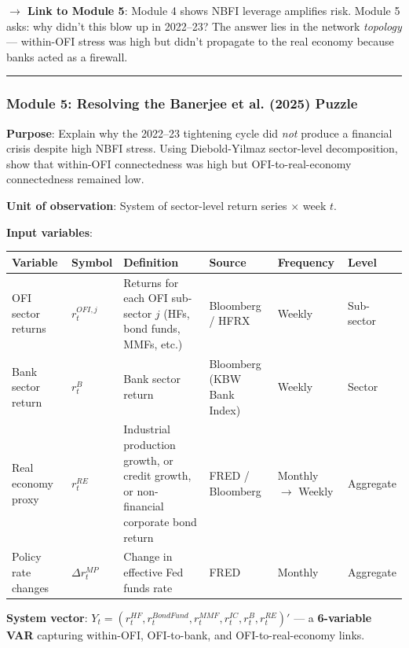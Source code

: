 \documentclass[11pt,a4paper]{article}
\begin{document}
\textbf{$\rightarrow$ Link to Module 5}: Module 4 shows NBFI leverage amplifies risk. Module 5 asks: why didn't this blow up in 2022--23? The answer lies in the network \textit{topology} --- within-OFI stress was high but didn't propagate to the real economy because banks acted as a firewall.


\bigskip\noindent\rule{\textwidth}{0.4pt}\bigskip


\subsubsection{Module 5: Resolving the Banerjee et al. (2025) Puzzle}

\textbf{Purpose}: Explain why the 2022--23 tightening cycle did \textit{not} produce a financial crisis despite high NBFI stress. Using Diebold-Yilmaz sector-level decomposition, show that within-OFI connectedness was high but OFI-to-real-economy connectedness remained low.

\textbf{Unit of observation}: System of sector-level return series $\times$ week $t$.

\textbf{Input variables}:


{\small
\begin{longtable}{|p{}|p{}|p{}|p{}|p{}|p{}|}
\hline
\textbf{Variable} & \textbf{Symbol} & \textbf{Definition} & \textbf{Source} & \textbf{Frequency} & \textbf{Level} \\
\hline
\endhead
OFI sector returns & $r_t^{OFI,j}$ & Returns for each OFI sub-sector $j$ (HFs, bond funds, MMFs, etc.) & Bloomberg / HFRX & Weekly & Sub-sector \\
\hline
Bank sector return & $r_t^{B}$ & Bank sector return & Bloomberg (KBW Bank Index) & Weekly & Sector \\
\hline
Real economy proxy & $r_t^{RE}$ & Industrial production growth, or credit growth, or non-financial corporate bond return & FRED / Bloomberg & Monthly $\rightarrow$ Weekly & Aggregate \\
\hline
Policy rate changes & $\Delta r_t^{MP}$ & Change in effective Fed funds rate & FRED & Monthly & Aggregate \\
\hline
\end{longtable}
}

\textbf{System vector}: $Y_t = (r_t^{HF}, r_t^{BondFund}, r_t^{MMF}, r_t^{IC}, r_t^{B}, r_t^{RE})'$ --- a \textbf{6-variable VAR} capturing within-OFI, OFI-to-bank, and OFI-to-real-economy links.
\end{document}
